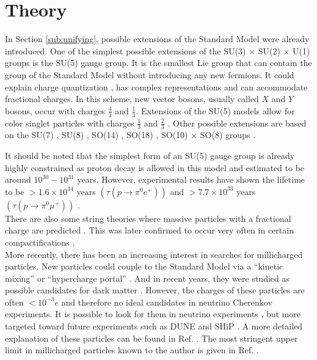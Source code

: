 \section{Theory}
In Section \ref{sub:unifying}, possible extensions of the Standard Model were already introduced. One of the simplest possible extensions of the SU(3) $\times$ SU(2) $\times$ U(1) groups is the SU(5) gauge group. It is the smallest Lie group that can contain the group of the Standard Model without introducing any new fermions. It could explain charge quantization \cite{He:1989eq}, has complex representations and can accommodate fractional charges. In this scheme, new vector bosons, usually called $X$ and $Y$ bosons, occur with charges $\frac{4}{3}$ and $\frac{1}{3}$. Extensions of the SU(5) models allow for color singlet particles with charges $\frac{1}{3}$ and $\frac{2}{3}$ \cite{Barr:1982vj}. Other possible extensions are based on the SU(7) \cite{Frampton:1982gc}, SU(8) \cite{Yu:1984pb}, SO(14) \cite{Yamamoto:1982sk}, SO(18) \cite{Dong:1983nh}, SO(10) $\times$ SO(8) groups \cite{Jiang:1985jy}. 

It should be noted that the simplest form of an SU(5) gauge group is already highly constrained as proton decay is allowed in this model and estimated to be around $10^{30}-10^{31}$ years. However, experimental results have shown the lifetime to be $>1.6 \times 10^{34}$ years $\left(\tau\left(p \rightarrow \pi^0 e^+\right)\right)$ and $>7.7 \times 10^{33}$ years $\left(\tau\left(p \rightarrow \pi^0 \mu^+\right)\right)$ \cite{Miura:2016krn}.\\
\newline
There are also some string theories where massive particles with a fractional charge are predicted \cite{Wen:1985qj,Antoniadis:1992eb}. This was later confirmed to occur very often in certain compactifications \cite{Athanasiu:1988uj}.\\

\noindent More recently, there has been an increasing interest in searches for millicharged particles. New particles could couple to the Standard Model via a ``kinetic mixing'' or ``hypercharge portal'' \cite{Holdom:1985ag,Izaguirre:2015eya}. And in recent years, they were studied as possible candidates for dark matter \cite{Brahm:1989jh,Boehm:2003hm,Pospelov:2007mp,Bjorken:2009mm}. However, the charges of these particles are often $<10^{-3}e$ and therefore no ideal candidates in neutrino Cherenkov experiments. It is possible to look for them in neutrino experiments \cite{Magill:2018tbb}, but more targeted toward future experiments such as DUNE \cite{Acciarri:2015uup} and SHiP \cite{Anelli:2015pba}. A more detailed explanation of these particles can be found in Ref. \cite{Battaglieri:2017aum}. The most stringent upper limit in millicharged particles known to the author is given in Ref. \cite{Alvis:2018yte}.\\

